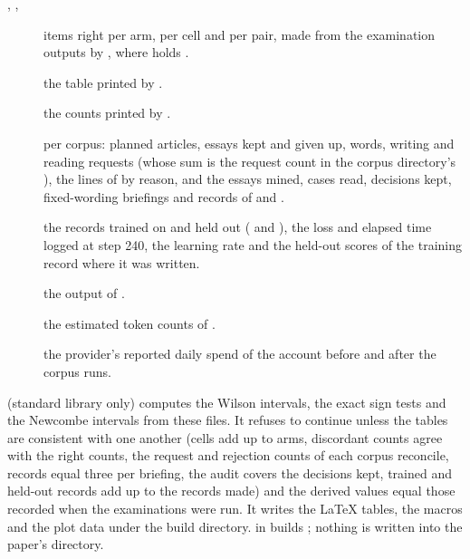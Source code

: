 \begin{description}
\item[, , ] items right per arm,
  per cell and per pair, made from the examination outputs by
  , where  holds
  .
\item[] the table printed by .
\item[] the counts printed by .
\item[] per corpus: planned articles, essays kept and given up, words,
  writing and reading requests (whose sum is the request count in the corpus directory's
  ), the lines of  by reason, and the essays mined,
  cases read, decisions kept, fixed-wording briefings and records of  and
  .
\item[] the records trained on and held out (
  and ), the loss and elapsed time logged at step 240, the
  learning rate and the held-out scores of the training record where it was written.
\item[] the output of .
\item[] the estimated token counts of .
\item[] the provider's reported daily spend of the account before and
  after the corpus runs.
\end{description}
 (standard library only) computes the Wilson intervals, the exact
sign tests and the Newcombe intervals from these files. It refuses to continue unless the
tables are consistent with one another (cells add up to arms, discordant counts agree with
the right counts, the request and rejection counts of each corpus reconcile, records equal
three per briefing, the audit covers the decisions kept, trained and held-out records add up
to the records made) and the derived values equal those recorded when the examinations were
run. It writes the LaTeX tables, the macros and the plot data under the build directory.
 in  builds ;
nothing is written into the paper's directory.
